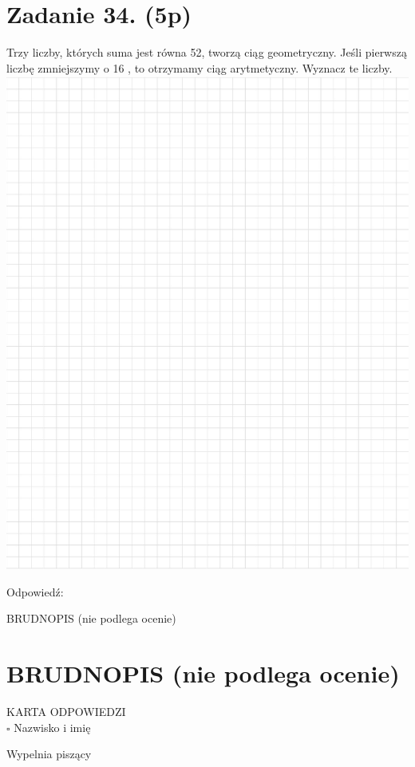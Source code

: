\documentclass[10pt]{article}
\begin{document}
\section*{Zadanie 34. (5p)}
Trzy liczby, których suma jest równa 52, tworzą ciąg geometryczny. Jeśli pierwszą liczbę zmniejszymy o 16 , to otrzymamy ciąg arytmetyczny. Wyznacz te liczby.\\
\includegraphics[max width=\textwidth, center]{2024_11_21_19ede52d758866b0d67eg-13}

Odpowiedź:

BRUDNOPIS (nie podlega ocenie)

\section*{BRUDNOPIS (nie podlega ocenie)}
KARTA ODPOWIEDZI\\
\(\square\) Nazwisko i imię

Wypelnia piszący
\end{document}
